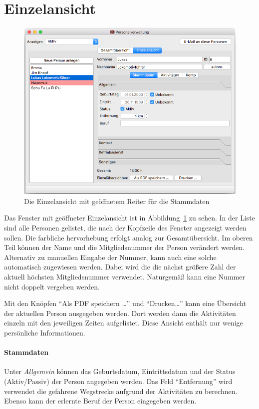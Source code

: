 \section{Einzelansicht}\label{personal:einzelansicht}
\begin{figure}[!h]
	\includegraphics[width=\textwidth]{img/einzelansicht_stammdate_allgemein}
	\caption{Die Einzelansicht mit geöffnetem Reiter für die Stammdaten}
	\label{fig:personal:einzel:stammdaten}
\end{figure}
Das Fenster mit geöffneter Einzelansicht ist in Abbildung~\ref{fig:personal:einzel:stammdaten} zu sehen.
In der Liste sind alle Personen gelistet, die nach der Kopfzeile des Fenster angezeigt werden sollen.
Die farbliche hervorhebung erfolgt analog zur Gesamtübersicht.
Im oberen Teil können der Name und die Mitgliedsnummer der Person verändert werden.
Alternativ zu manuellen Eingabe der Nummer, kann auch eine solche automatisch zugewiesen werden.
Dabei wird die die nächst größere Zahl der aktuell höchsten Mitgliedsnummer verwendet.
Naturgemäß kann eine Nummer nicht doppelt vergeben werden.

Mit den Knöpfen "`Als PDF speichern \dots"' und "`Drucken\dots"' kann eine Übersicht der aktuellen Person ausgegeben werden.
Dort werden dann die Aktivitäten einzeln mit den jeweiligen Zeiten aufgelistet.
Diese Ansicht enthält nur wenige persönliche Informationen.


\paragraph{Stammdaten}
Unter \emph{Allgemein} können das Geburtsdatum, Eintrittsdatum und der Status (Aktiv/Passiv) der Person angegeben werden.
Das Feld "`Entfernung"' wird verwendet die gefahrene Wegstrecke aufgrund der Aktivitäten zu berechnen.
Ebenso kann der erlernte Beruf der Person eingegeben werden.

